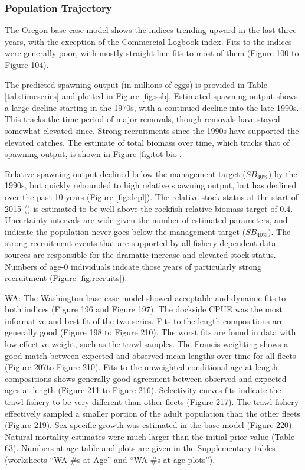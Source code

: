 \documentclass[11pt,
  english,
  letterpaper,
]{article}
\begin{document}
\hypertarget{population-trajectory}{%
\subsubsection{Population Trajectory}\label{population-trajectory}}

The Oregon base case model shows the indices trending upward in the last three years, with the exception of the Commercial Logbook index. Fits to the indices were generally poor, with mostly straight-line fits to most of them (Figure 100 to Figure 104).

The predicted spawning output (in millions of eggs) is provided in Table \ref{tab:timeseries} and plotted in Figure \ref{fig:ssb}. Estimated spawning output shows a large decline starting in the 1970s, with a continued decline into the late 1990s. This tracks the time period of major removals, though removals have stayed somewhat elevated since. Strong recruitments since the 1990s have supported the elevated catches. The estimate of total biomass over time, which tracks that of spawning output, is shown in Figure \ref{fig:tot-bio}.

Relative spawning output declined below the management target (\(SB_{40\%}\)) by the 1990s, but quickly rebounded to high relative spawning output, but has declined over the past 10 years (Figure \ref{fig:depl}). The relative stock status at the start of 2015 () is estimated to be well above the rockfish relative biomass target of 0.4. Uncertainty intervals are wide given the number of estimated parameters, and indicate the population never goes below the management target (\(SB_{40\%}\)). The strong recruitment events that are supported by all fishery-dependent data sources are responsible for the dramatic increase and elevated stock status. Numbers of age-0 individuals indcate those years of particularly strong recruitment (Figure \ref{fig:recruits}).

WA: The Washington base case model showed acceptable and dynamic fits to both indices (Figure 196 and Figure 197). The dockside CPUE was the most informative and best fit of the two series. Fits to the length compositions are generally good (Figure 198 to Figure 210). The worst fits are found in data with low effective weight, such as the trawl samples. The Francis weighting shows a good match between expected and observed mean lengths over time for all fleets (Figure 207to Figure 210). Fits to the unweighted conditional age-at-length compositions shows generally good agreement between observed and expected ages at length (Figure 211 to Figure 216). Selectivity curves fits indicate the trawl fishery to be very different than other fleets (Figure 217). The trawl fishery effectively sampled a smaller portion of the adult population than the other fleets (Figure 219). Sex-specific growth was estimated in the base model (Figure 220). Natural mortality estimates were much larger than the initial prior value (Table 63). Numbers at age table and plots are given in the Supplementary tables (worksheets ``WA \#s at Age'' and ``WA \#s at age plots'').
\end{document}
